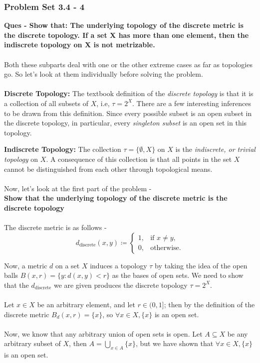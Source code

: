 
\begin{frame}
    \frametitle{Problem Set 3.4 - 4}
    \textbf{Ques - Show that: The underlying topology of the discrete metric is the discrete topology. If a set X has more than one element, then the indiscrete topology on X is not metrizable.}\\\\
    Both these subparts deal with one or the other extreme cases as far as topologies go. So let's look at them individually before solving the problem.\\\\
    \pause
    \textbf{Discrete Topology:} The textbook definition of the \textit{discrete topology} is that it is a collection of all subsets of $X$, i.e, $\tau = 2^{X}$. There are a few interesting inferences to be drawn from this definition. Since every possible subset is an open subset in the discrete topology, in particular, every \textit{singleton subset} is an open set in this topology.
\end{frame}

\begin{frame}
    \textbf{Indiscrete Topology:} The collection $\tau = \{ \emptyset , X \}$ on $X$ is the \textit{indiscrete, or trivial topology} on $X$. A consequence of this collection is that all points in the set $X$ cannot be distinguished from each other through topological means.\\\\
    Now, let's look at the first part of the problem - \\
    \pause
    \textbf{Show that the underlying topology of the discrete metric is the discrete topology} \\\\
    \pause
    The discrete metric is as follows - \\
    \[
        d_{\text{discrete}}(x,y) \coloneqq 
        \begin{cases}
            1, & \text{if } x \neq y, \\
            0, & \text{otherwise}.
        \end{cases}
    \]
\end{frame}

\begin{frame}
    Now, a metric $d$ on a set $X$ induces a topology $\tau$ by taking the idea of the open balls $B(x,r) = \{y : d(x,y) < r\}$ as the bases of open sets. We need to show that the $d_{\text{discrete}}$ we are given produces the discrete topology $\tau = 2^{X}$.\\\\
    \pause
    Let $x \in X$ be an arbitrary element, and let $r \in (0, 1]$; then by the definition of the discrete metric $B_d(x,r) = \{x\}$, so $\forall x \in X, \{x\}$ is an open set.\\\\
    \pause
    Now, we know that any arbitrary union of open sets is open. Let $A \subseteq X$ be any arbitrary subset of $X$, then $A = \bigcup_{x \in A} \{x\}$, but we have shown that $\forall x \in X, \{x\}$ is an open set.
\end{frame}

